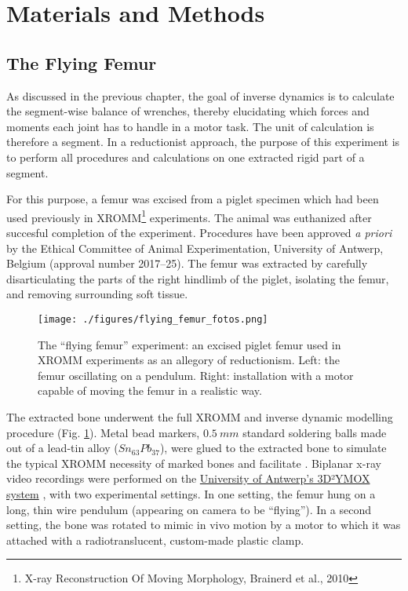 \FloatBarrier\clearpage
\section{Materials and Methods}
\label{sec:org3aeccf5}
\subsection{The Flying Femur}
\label{sec:org9474f8d}

As discussed in the previous chapter, the goal of inverse dynamics is to calculate the segment-wise balance of wrenches, thereby elucidating which forces and moments each joint has to handle in a motor task.
The unit of calculation is therefore a segment.
In a reductionist approach, the purpose of this experiment is to perform all procedures and calculations on one extracted rigid part of a segment.

For this purpose, a femur was excised from a piglet specimen which had been used previously in XROMM\footnote{X-ray Reconstruction Of Moving Morphology, Brainerd et al., 2010} experiments. \nocite{Brainerd2010}
The animal was euthanized after succesful completion of the experiment.
Procedures have been approved \emph{a priori} by the Ethical Committee of Animal Experimentation, University of Antwerp, Belgium (approval number 2017–25).
The femur was extracted by carefully disarticulating the parts of the right hindlimb of the piglet, isolating the femur, and removing surrounding soft tissue.

\begin{figure}[p]
\centering
\texttt{[image: ./figures/flying\_femur\_fotos.png]}
\caption{\label{fig:flying_femur_fotos}The ``flying femur'' experiment: an excised piglet femur used in XROMM experiments as an allegory of reductionism. Left: the femur oscillating on a pendulum. Right: installation with a motor capable of moving the femur in a realistic way.}
\end{figure}


The extracted bone underwent the full XROMM and inverse dynamic modelling procedure (Fig. \ref{fig:flying_femur_fotos}).
Metal bead markers, \(0.5\ mm\) standard soldering balls made out of a lead-tin alloy (\(Sn_{63}Pb_{37}\)), were glued to the extracted bone to simulate the typical XROMM necessity of marked bones and facilitate .
Biplanar x-ray video recordings were performed on the \href{https://www.uantwerpen.be/3d2ymox}{University of Antwerp's 3D²YMOX system} \citep{Nguyen2021,Sanctorum2020}, with two experimental settings.
In one setting, the femur hung on a long, thin wire pendulum (appearing on camera to be ``flying'').
In a second setting, the bone was rotated to mimic in vivo motion by a motor to which it was attached with a radiotranslucent, custom-made plastic clamp.

